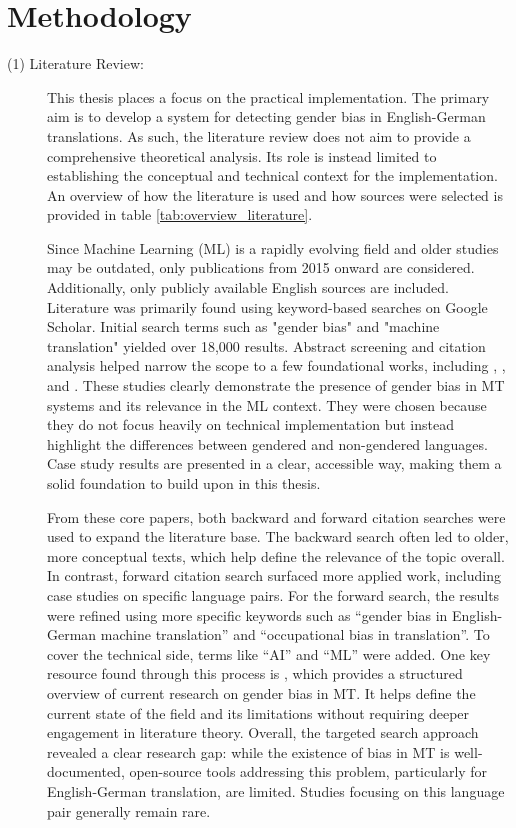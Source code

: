 \section{Methodology}
\begin{description}

\item[(1) Literature Review:] 
This thesis places a focus on the practical implementation. The primary aim is to develop a system for detecting gender bias in English-German translations. As such, the literature review does not aim to provide a comprehensive theoretical analysis. Its role is instead limited to establishing the conceptual and technical context for the implementation. An overview of how the literature is used and how sources were selected is provided in table \ref{tab:overview_literature}.

Since Machine Learning (ML) is a rapidly evolving field and older studies may be outdated, only publications from 2015 onward are considered. Additionally, only publicly available English sources are included. Literature was primarily found using keyword-based searches on Google Scholar. Initial search terms such as "gender bias" and "machine translation" yielded over 18,000 results. Abstract screening and citation analysis helped narrow the scope to a few foundational works, including \textcite{prates_assessing_2019}, \textcite{stanovsky_evaluating_2019}, and \textcite{cho_measuring_2019}. These studies clearly demonstrate the presence of gender bias in MT systems and its relevance in the ML context. They were chosen because they do not focus heavily on technical implementation but instead highlight the differences between gendered and non-gendered languages. Case study results are presented in a clear, accessible way, making them a solid foundation to build upon in this thesis.

From these core papers, both backward and forward citation searches were used to expand the literature base. The backward search often led to older, more conceptual texts, which help define the relevance of the topic overall. In contrast, forward citation search surfaced more applied work, including case studies on specific language pairs. For the forward search, the results were refined using more specific keywords such as “gender bias in English-German machine translation” and “occupational bias in translation”. To cover the technical side, terms like “AI” and “ML” were added. One key resource found through this process is \textcite{shrestha_exploring_2022}, which provides a structured overview of current research on gender bias in MT. It helps define the current state of the field and its limitations without requiring deeper engagement in literature theory. Overall, the targeted search approach revealed a clear research gap: while the existence of bias in MT is well-documented, open-source tools addressing this problem, particularly for English-German translation, are limited. Studies focusing on this language pair generally remain rare.


\end{description}
